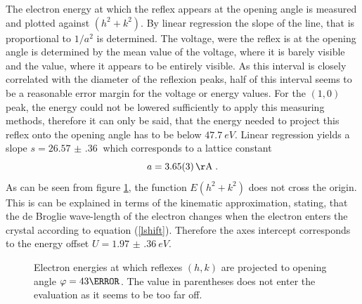\documentclass[a4paper]{scrartcl}
\numberwithin{equation}{section}
\numberwithin{figure}{section}
\numberwithin{table}{section}
\newcommand{\eq}[2]{\begin{equation}#1\label{#2}\end{equation}}
\newcommand{\Formel}[1]{(\ref{#1})}
\begin{document}
The electron energy at which the reflex appears at the opening angle is measured and plotted against $(h^2+k^2)$. By linear regression the slope   of the line, that is proportional to $ 1/a^2 $  is determined. The voltage, were the reflex is at the opening angle is determined by the mean value of the voltage, where it is barely visible and the value, where it appears to be entirely visible. As this interval is closely correlated with the diameter of the reflexion peaks, half of this interval seems to be a reasonable error margin for the voltage or energy  values. For the $(1,0)$ peak, the energy could not be lowered sufficiently to apply this measuring methods, therefore it can only be said, that the energy needed to project this reflex onto the opening angle has to be below $\SI{47.7}{eV}$. Linear regression yields a slope $s=\SI{26.57(36)}{}$ which corresponds to a lattice constant 
\eq{a=\SI{3.65(3)}{\AA}\;.}{a1}
As can be seen from figure \ref{rr}, the function $E(h^2+k^2)$ does not cross the origin. This is can be explained in terms of the kinematic approximation, stating, that the de Broglie wave-length of the electron changes when the electron enters the crystal according to equation \Formel{lshift}. Therefore the axes intercept corresponds to the energy offset $U=\SI{1.97(36)}{eV}$.

 \begin{figure} 
 \centering
{}
\hfill
{}

\caption{\small Electron energies at which reflexes $(h,k)$ are projected to opening angle $\varphi=43 \degree$. The value in parentheses does not enter the evaluation as it seems to be too far off.}
	\label{rr}
\end{figure}
\end{document}
